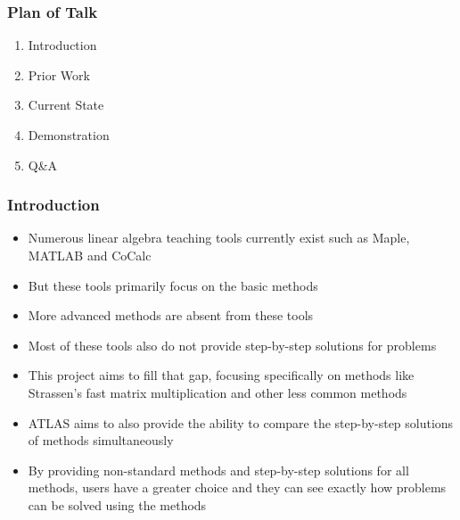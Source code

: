\date{30 July 2021 at MathUI/CICM 2021}
\expandafter\def\expandafter\insertshorttitle\expandafter{%
  \insertshorttitle\hfill%
  \insertframenumber\,/\,\inserttotalframenumber}
\frame{
\titlepage
} 
\begin{frame}[fragile]
\frametitle{Plan of Talk}
\begin{enumerate}%
\item Introduction
\item Prior Work
\item Current State
\item Demonstration
\item Q\&A
\end{enumerate}
\end{frame}
\begin{frame}
\frametitle{Introduction}%
\begin{itemize}[<+->]
\item Numerous linear algebra teaching tools currently exist such as Maple, MATLAB and CoCalc
\item But these tools primarily focus on the basic methods
\item More advanced methods are absent from these tools
\item Most of these tools also do not provide step-by-step solutions for problems
\item This project aims to fill that gap, focusing specifically on methods like Strassen's fast matrix multiplication and other less common methods
\item ATLAS aims to also provide the ability to compare the step-by-step solutions of methods simultaneously
\item By providing non-standard methods and step-by-step solutions for all methods, users have a greater choice and they can see exactly how problems can be solved using the methods
\end{itemize}
\end{frame}

